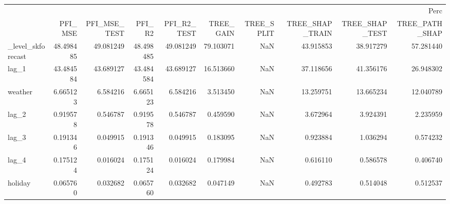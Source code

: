 \begin{tabular}{lrrrrrrrrr}
\toprule
 & \multicolumn{9}{r}{Perc} \\
 & PFI_MSE & PFI_MSE_TEST & PFI_R2 & PFI_R2_TEST & TREE_GAIN & TREE_SPLIT & TREE_SHAP_TRAIN & TREE_SHAP_TEST & TREE_PATH_SHAP \\
\midrule
_level_skforecast & 48.498485 & 49.081249 & 48.498485 & 49.081249 & 79.103071 & NaN & 43.915853 & 38.917279 & 57.281440 \\
lag_1 & 43.484584 & 43.689127 & 43.484584 & 43.689127 & 16.513660 & NaN & 37.118656 & 41.356176 & 26.948302 \\
weather & 6.665123 & 6.584216 & 6.665123 & 6.584216 & 3.513450 & NaN & 13.259751 & 13.665234 & 12.040789 \\
lag_2 & 0.919578 & 0.546787 & 0.919578 & 0.546787 & 0.459590 & NaN & 3.672964 & 3.924391 & 2.235959 \\
lag_3 & 0.191346 & 0.049915 & 0.191346 & 0.049915 & 0.183095 & NaN & 0.923884 & 1.036294 & 0.574232 \\
lag_4 & 0.175124 & 0.016024 & 0.175124 & 0.016024 & 0.179984 & NaN & 0.616110 & 0.586578 & 0.406740 \\
holiday & 0.065760 & 0.032682 & 0.065760 & 0.032682 & 0.047149 & NaN & 0.492783 & 0.514048 & 0.512537 \\
\bottomrule
\end{tabular}
